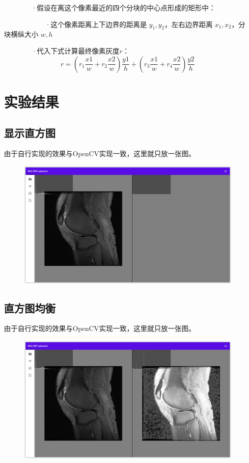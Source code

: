 \documentclass{article}
\begin{document}
~~~~~~~~·假设在离这个像素最近的四个分块的中心点形成的矩形中：

~~~~~~~~~~~~·这个像素距离上下边界的距离是 $y_1, y_2$，左右边界距离 $x_1, x_2$，分块横纵大小 $w, h$

~~~~~~~~·代入下式计算最终像素灰度$r$：$$r = (r_1 \frac{x1}{w} + r_2 \frac{x2}{w})\frac{y1}{h} + (r_3 \frac{x1}{w} + r_4 \frac{x2}{w})\frac{y2}{h}$$

\section{实验结果}

\subsection{显示直方图}

由于自行实现的效果与OpenCV实现一致，这里就只放一张图。

\begin{figure}[H]
    \includegraphics[width=\textwidth]{img/histo_disp.png}
\end{figure}

\subsection{直方图均衡}

由于自行实现的效果与OpenCV实现一致，这里就只放一张图。

\begin{figure}[H]
    \includegraphics[width=\textwidth]{img/histo_equ.png}
\end{figure}
\end{document}
